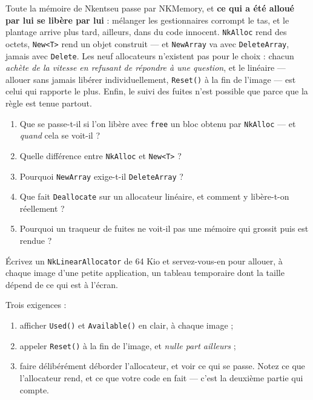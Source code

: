 \begin{nkbilan}
Toute la mémoire de Nkentseu passe par NKMemory, et \textbf{ce qui a été alloué
par lui se libère par lui} : mélanger les gestionnaires corrompt le tas, et le
plantage arrive plus tard, ailleurs, dans du code innocent. \texttt{NkAlloc} rend
des octets, \texttt{New<T>} rend un objet construit --- et \texttt{NewArray} va
avec \texttt{DeleteArray}, jamais avec \texttt{Delete}. Les neuf allocateurs
n'existent pas pour le choix : chacun \emph{achète de la vitesse en refusant de
répondre à une question}, et le linéaire --- allouer sans jamais libérer
individuellement, \texttt{Reset()} à la fin de l'image --- est celui qui rapporte
le plus. Enfin, le suivi des fuites n'est possible que parce que la règle est
tenue partout.
\end{nkbilan}

\begin{nkquestions}
\begin{enumerate}
\item Que se passe-t-il si l'on libère avec \texttt{free} un bloc obtenu par
      \texttt{NkAlloc} --- et \emph{quand} cela se voit-il ?
\item Quelle différence entre \texttt{NkAlloc} et \texttt{New<T>} ?
\item Pourquoi \texttt{NewArray} exige-t-il \texttt{DeleteArray} ?
\item Que fait \texttt{Deallocate} sur un allocateur linéaire, et comment y
      libère-t-on réellement ?
\item Pourquoi un traqueur de fuites ne voit-il pas une mémoire qui grossit puis
      est rendue ?
\end{enumerate}
\end{nkquestions}

\begin{nkpratique}
Écrivez un \texttt{NkLinearAllocator} de 64 Kio et servez-vous-en pour allouer,
à chaque image d'une petite application, un tableau temporaire dont la taille
dépend de ce qui est à l'écran.

Trois exigences :
\begin{enumerate}
\item afficher \texttt{Used()} et \texttt{Available()} en clair, à chaque image ;
\item appeler \texttt{Reset()} à la fin de l'image, et \emph{nulle part
      ailleurs} ;
\item faire délibérément déborder l'allocateur, et voir ce qui se passe. Notez
      ce que l'allocateur rend, et ce que votre code en fait --- c'est la
      deuxième partie qui compte.
\end{enumerate}
\end{nkpratique}

